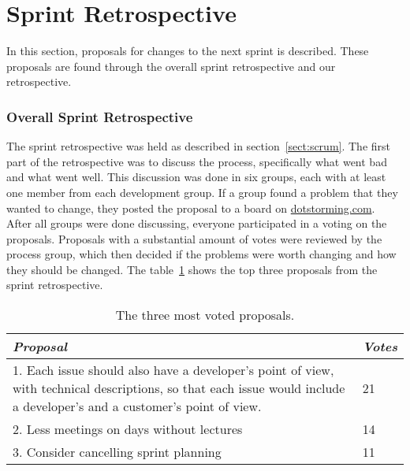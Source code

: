 \section{Sprint Retrospective}
\label{sect:retrospectiveSprint1}
In this section, proposals for changes to the next sprint is described. These proposals are found through the overall sprint retrospective and our retrospective.

\subsubsection{Overall Sprint Retrospective}
\label{sect:teamRetrospectiveSprint1}
The sprint retrospective was held as described in section~\ref{sect:scrum}. The first part of the retrospective was to discuss the process, specifically what went bad and what went well. This discussion was done in six groups, each with at least one member from each development group. 
If a group found a problem that they wanted to change, they posted the proposal to a board on \url{dotstorming.com}. 
After all groups were done discussing, everyone participated in a voting on the proposals. 
Proposals with a substantial amount of votes were reviewed by the process group, which then decided if the problems were worth changing and how they should be changed.
The table~\ref{table:retrospectiveIdeas} shows the top three proposals from the sprint retrospective.

\begin{table}[htbp]
\begin{tabularx}{\textwidth}{X|l}
\textit{Proposal}    & \textit{Votes}  \\ \hline
1. Each issue should also have a developer's point of view, with technical descriptions, so that each issue would include a developer's and a customer's point of view.  & 21  \\ \hline
2. Less meetings on days without lectures & 14 \\ \hline
3. Consider cancelling sprint planning & 11  \\ \hline
\end{tabularx}
\caption{The three most voted proposals.}
\label{table:retrospectiveIdeas}
\end{table}

